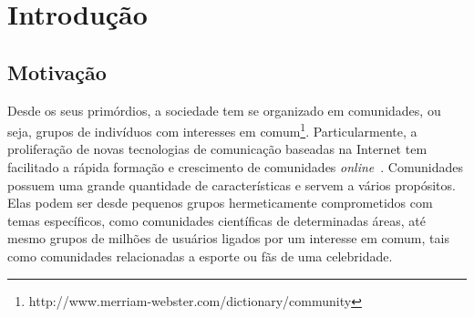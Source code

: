 \chapter{Introdução}\label{introducao}

\section{Motivação}

Desde os seus primórdios, a sociedade tem se organizado em comunidades, ou seja, grupos de indivíduos 
com interesses em comum\footnote{http://www.merriam-webster.com/dictionary/community}. Particularmente, 
a proliferação de novas tecnologias de comunicação baseadas na Internet tem facilitado a rápida 
formação e crescimento de comunidades \textit{online}~\citep{Kleinberg2008}. Comunidades possuem uma grande 
quantidade de características e servem a vários propósitos. Elas podem ser desde pequenos 
grupos hermeticamente comprometidos com temas específicos, como comunidades científicas de determinadas áreas, 
até mesmo grupos de milhões de usuários ligados por um interesse em comum, tais como comunidades 
relacionadas a esporte ou fãs de uma celebridade.

